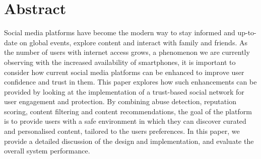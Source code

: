 \chapter*{Abstract}
Social media platforms have become the modern way to stay informed and up-to-date on global events, explore content and interact with family and friends. As the number of users with internet access grows, a phenomenon we are currently observing with the increased availability of smartphones, it is important to consider how current social media platforms can be enhanced to improve user confidence and trust in them. This paper explores how such enhancements can be provided by looking at the implementation of a trust-based social network for user engagement and protection. By combining abuse detection, reputation scoring, content filtering and content recommendations, the goal of the platform is to provide users with a safe environment in which they can discover curated and personalised content, tailored to the users preferences. In this paper, we provide a detailed discussion of the design and implementation, and evaluate the overall system performance. 